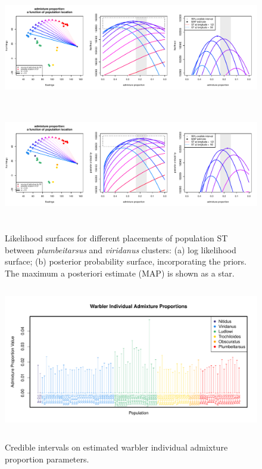 \documentclass[10pt,letterpaper]{article}
\begin{document}
\begin{figure}
	\centering
			{\includegraphics[width=6in,height=2in]{../figs/warblers/admix_prop_func_loc_lnl.pdf}}
			{\includegraphics[width=6in,height=2in]{../figs/warblers/admix_prop_func_loc_prob.pdf}}
	\caption{Likelihood surfaces for different placements of population ST between \textit{plumbeitarsus} and \textit{viridanus} clusters: (a) log likelihood surface; (b) posterior probability surface, incorporating the priors. The maximum a posteriori estimate (MAP) is shown as a star. }\label{sfig:admix_prop_func_loc}
\end{figure}

\clearpage

\begin{figure}
\centering
	{\includegraphics[width=5in,height=2.5in]{../figs/warblers/warb_ind_adprop.pdf}}
	\caption{Credible intervals on estimated warbler individual admixture proportion parameters.}\label{sfig:warb_ind_adprops}
\end{figure}
\end{document}
